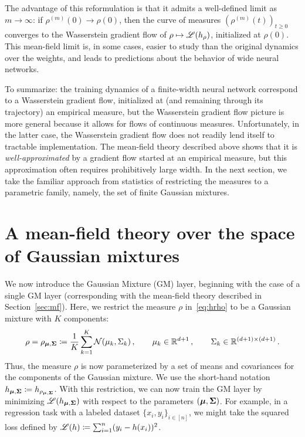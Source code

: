 \documentclass{custom}
\begin{document}
The advantage of this reformulation is that it admits a well-defined limit as $m\to\infty$: if $\rho^{(m)}(0) \to \rho(0)$, then the curve of measures ${(\rho^{(m)}(t))}_{t\ge 0}$ converges to the Wasserstein gradient flow of $\rho\mapsto \mathscr L(h_\rho)$, initialized at $\rho(0)$.
This mean-field limit is, in some cases, easier to study than the original dynamics over the weights, and leads to predictions about the behavior of wide neural networks.

To summarize: the training dynamics of a finite-width neural network correspond to a Wasserstein gradient flow, initialized at (and remaining through its trajectory) an empirical measure, but the Wasserstein gradient flow picture is more general because it allows for flows of continuous measures.
Unfortunately, in the latter case, the Wasserstein gradient flow does not readily lend itself to tractable implementation.
The mean-field theory described above shows that it is \emph{well-approximated} by a gradient flow started at an empirical measure, but this approximation often requires prohibitively large width.
In the next section, we take the familiar approach from statistics of restricting the measures to a parametric family, namely, the set of finite Gaussian mixtures.


\section{A mean-field theory over the space of Gaussian mixtures}\label{sec:gm_layer}


We now introduce the Gaussian Mixture (GM) layer, beginning with the case of a single GM layer (corresponding with the mean-field theory described in Section~\ref{sec:mf}).
Here, we restrict the measure $\rho$ in~\eqref{eq:hrho} to be a Gaussian mixture with $K$ components:
\begin{align}\label{eq:gmm}
    \rho = \rho_{\boldsymbol \mu,\boldsymbol \Sigma} \coloneqq \frac{1}{K} \sum_{k=1}^K \mathcal N(\mu_k,\Sigma_k)\,, \qquad \mu_k \in \mathbb R^{d+1}\,, \qquad \Sigma_k \in \mathbb R^{(d+1)\times (d+1)}\,.
\end{align}
Thus, the measure $\rho$ is now parameterized by a set of means and covariances for the components of the Gaussian mixture.
We use the short-hand notation $h_{\boldsymbol \mu,\boldsymbol \Sigma} \coloneqq h_{\rho_{\boldsymbol \mu,\boldsymbol \Sigma}}$.
With this restriction, we can now train the GM layer by minimizing $\mathscr L(h_{\boldsymbol \mu,\boldsymbol \Sigma})$ with respect to the parameters $(\boldsymbol \mu,\boldsymbol \Sigma)$.
For example, in a regression task with a labeled dataset $\{x_i,y_i\}_{i\in [n]}$, we might take the squared loss defined by $\mathscr L(h) \coloneqq \sum_{i=1}^n (y_i - h(x_i))^2$.
\end{document}
